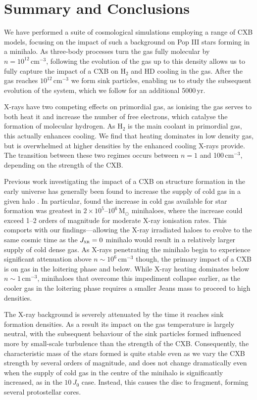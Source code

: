 \documentclass{thesis}
\newcommand{\cc}{\ensuremath{\,\mathrm{cm}^{-3}}\xspace}
\newcommand{\msun}{\ensuremath{\,\mathrm{M}_{\odot}}\xspace}
\newcommand{\yr}{\ensuremath{\,\mathrm{yr}}\xspace}
\newcommand{\htwo}{\ensuremath{\mathrm{H}_2}\xspace}
\newcommand{\hd}{\ensuremath{\mathrm{HD}}\xspace}
\newcommand{\jxr}{\ensuremath{J_{\textsc{xr}}}\xspace}
\begin{document}
\section{Summary and Conclusions}
\label{conclusions}
We have performed a suite of cosmological simulations employing a range of CXB models, focusing on the impact of such a background on Pop III stars forming in a minihalo.  As three-body processes turn the gas fully molecular by $n=10^{12}\cc$, following the evolution of the gas up to this density allows us to fully capture the impact of a CXB on \htwo and \hd cooling in the gas.  After the gas reaches $10^{12}\cc$ we form sink particles, enabling us to study the subsequent evolution of the system, which we follow for an additional 5000\yr.

X-rays have two competing effects on primordial gas, as ionising the gas serves to both heat it and increase the number of free electrons, which catalyse the formation of molecular hydrogen.  As \htwo is the main coolant in primordial gas, this actually enhances cooling.  We find that heating dominates in low density gas, but is overwhelmed at higher densities by the enhanced cooling X-rays provide.  The transition between these two regimes occurs between $n=1$ and 100\cc, depending on the strength of the CXB.  

Previous work investigating the impact of a CXB on structure formation in the early universe has generally been found to increase the supply of cold gas in a given halo \citep{HaimanAbelRees2000, VenkatesanGirouxShull2001, GloverBrand2003, Cen2003, KuhlenMadau2005, Jeonetal2012}.  In particular, \citet{KuhlenMadau2005} found the increase in cold gas available for star formation was greatest in $2\times10^5$--$10^6\msun$ minihaloes, where the increase could exceed 1--2 orders of magnitude for moderate X-ray ionisation rates. This comports with our findings---allowing the X-ray irradiated haloes to evolve to the same cosmic time as the $\jxr=0$ minihalo would result in a relatively larger supply of cold dense gas. As X-rays penetrating the minihalo begin to experience significant attenuation above $n\sim10^6\cc$ though, the primary impact of a CXB is on gas in the loitering phase and below. While X-ray heating dominates below $n\sim 1\cc$, minihaloes that overcome this impediment collapse earlier, as the cooler gas in the loitering phase requires a smaller Jeans mass to proceed to high densities.  

The X-ray background is severely attenuated by the time it reaches sink formation densities. As a result its impact on the gas temperature is largely neutral, with the subsequent behaviour of the sink particles formed influenced more by small-scale  turbulence than the strength of the CXB.  Consequently, the characteristic mass of the stars formed is quite stable even as we vary the CXB strength by several orders of magnitude, and does not change dramatically even when the supply of cold gas in the centre of the minihalo is significantly increased, as in the $10\,J_0$ case.  Instead, this causes the disc to fragment, forming several protostellar cores.
\end{document}
